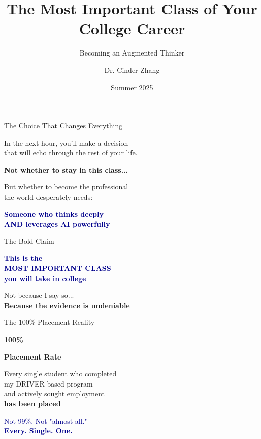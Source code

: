 \documentclass[aspectratio=169,12pt]{beamer}
\title{The Most Important Class of Your College Career}
\subtitle{Becoming an Augmented Thinker}
\author{Dr. Cinder Zhang}
\institute{Purdue University}
\date{Summer 2025}
\begin{document}
\begin{frame}
\titlepage
\end{frame}

\begin{frame}{The Choice That Changes Everything}
\begin{center}
\Large
In the next hour, you'll make a decision\\
that will echo through the rest of your life.

\vspace{0.5cm}
\normalsize
\textbf{Not whether to stay in this class...}

\vspace{0.3cm}
\large
But whether to become the professional\\
the world desperately needs:

\vspace{0.5cm}
\textcolor{darkblue}{\textbf{Someone who thinks deeply\\
AND leverages AI powerfully}}
\end{center}
\end{frame}

\begin{frame}{The Bold Claim}
\begin{center}
\Huge
\textcolor{darkblue}{\textbf{This is the\\
MOST IMPORTANT CLASS\\
you will take in college}}

\vspace{1cm}
\large
Not because I say so...\\
\vspace{0.3cm}
\textbf{Because the evidence is undeniable}
\end{center}
\end{frame}

\begin{frame}{The 100\% Placement Reality}
\begin{center}
\Huge
\textcolor{successgreen}{\textbf{100\%}}

\vspace{0.5cm}
\Large
\textbf{Placement Rate}

\vspace{0.5cm}
\normalsize
Every single student who completed\\
my DRIVER-based program\\
and actively sought employment\\
\textbf{has been placed}

\vspace{0.5cm}
\large
\textcolor{darkblue}{Not 99\%. Not "almost all."\\
\textbf{Every. Single. One.}}
\end{center}
\end{frame}
\end{document}
